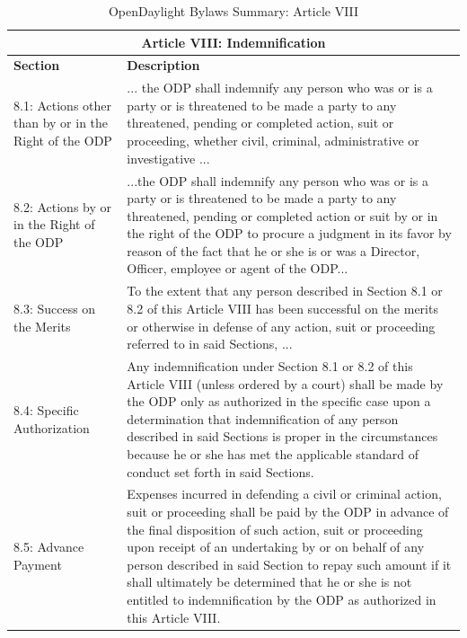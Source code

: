 \documentclass[a4paper, 12pt]{book}
\begin{document}
\begin{table}[H]
  \begin{center}
    \begin{tabular}{ | p{4cm} | p{11cm} | }
    \toprule
    \multicolumn {2}{|c|}{\textbf{Article VIII: Indemnification}} \\
    \hline
    \textbf{Section} & \textbf{Description} \\
    \hline
    8.1: Actions other than by or in the Right of the ODP & ... the ODP shall indemnify any person who was or is a party or is threatened to be made a party to any threatened, pending or completed action, suit or proceeding, whether civil, criminal, administrative or investigative ...\\
    \hline
    8.2: Actions by or in the Right of the ODP & ...the ODP shall indemnify any person who was or is a party or is threatened to be made a party to any threatened, pending or completed action or suit by or in the right of the ODP to procure a judgment in its favor by reason of the fact that he or she is or was a Director, Officer, employee or agent of the ODP...\\
    \hline
    8.3: Success on the Merits & To the extent that any person described in Section 8.1 or 8.2 of this Article VIII has been successful on the merits or otherwise in defense of any action, suit or proceeding referred to in said Sections, ...\\
    \hline
    8.4: Specific Authorization & Any indemnification under Section 8.1 or 8.2 of this Article VIII (unless ordered by a court) shall be made by the ODP only as authorized in the specific case upon a determination that indemnification of any person described in said Sections is proper in the circumstances because he or she has met the applicable standard of conduct set forth in said Sections.\\
    \hline
    8.5: Advance Payment & Expenses incurred in defending a civil or criminal action, suit or proceeding shall be paid by the ODP in advance of the final disposition of such action, suit or proceeding upon receipt of an undertaking by or on behalf of any person described in said Section to repay such amount if it shall ultimately be determined that he or she is not entitled to indemnification by the ODP as authorized in this Article VIII.\\
    \bottomrule
    \end{tabular}
    \caption{OpenDaylight Bylaws Summary: Article VIII}
    \label{tab:odlbylaws-art08}
  \end{center}
\end{table}
\end{document}
